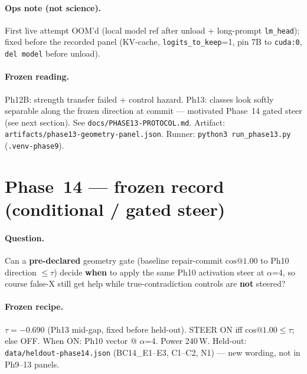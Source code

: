 \documentclass[11pt,a4paper]{article}
\begin{document}
\paragraph{Ops note (not science).}
First live attempt OOM'd (local model ref after unload + long-prompt \texttt{lm\_head}); fixed before the recorded panel (KV-cache, \texttt{logits\_to\_keep}=1, pin 7B to \texttt{cuda:0}, \texttt{del model} before unload).

\paragraph{Frozen reading.}
Ph12B: strength transfer failed + control hazard.
Ph13: classes look softly separable along the frozen direction at commit --- motivated Phase~14 gated steer (see next section).
See \texttt{docs/PHASE13-PROTOCOL.md}. Artifact: \texttt{artifacts/phase13-geometry-panel.json}.
Runner: \texttt{python3 run\_phase13.py} (\texttt{.venv-phase9}).

\section{Phase~14 --- frozen record (conditional / gated steer)}

\paragraph{Question.}
Can a \textbf{pre-declared} geometry gate (baseline repair-commit $\mathrm{cos}@1.00$ to Ph10 direction $\leq \tau$) decide \textbf{when} to apply the same Ph10 activation steer at $\alpha$=4, so course false-X still get help while true-contradiction controls are \textbf{not} steered?

\paragraph{Frozen recipe.}
$\tau = -0.690$ (Ph13 mid-gap, fixed before held-out). STEER ON iff $\mathrm{cos}@1.00 \leq \tau$; else OFF. When ON: Ph10 vector @ $\alpha$=4. Power 240\,W.
Held-out: \texttt{data/heldout-phase14.json} (BC14\_E1--E3, C1--C2, N1) --- new wording, not in Ph9--13 panels.
\end{document}
